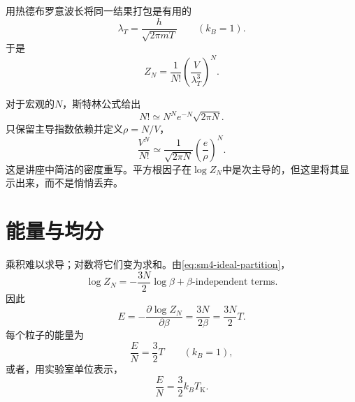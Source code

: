 用热德布罗意波长将同一结果打包是有用的
\begin{equation}
 \lambda_T=\frac{h}{\sqrt{2\pi mT}}
 \qquad (k_B=1).
\end{equation}
于是
\begin{equation}
 Z_N=\frac{1}{N!}\left(\frac{V}{\lambda_T^3}\right)^N.
 \label{eq:sm4-thermal-wavelength-form}
\end{equation}

对于宏观的\(N\)，斯特林公式给出
\begin{equation}
 N!\simeq N^Ne^{-N}\sqrt{2\pi N}.
\end{equation}
只保留主导指数依赖并定义\(\rho=N/V\)，
\begin{equation}
 \frac{V^N}{N!}
 \simeq
 \frac{1}{\sqrt{2\pi N}}
 \left(\frac{e}{\rho}\right)^N.
 \label{eq:sm4-density-rewrite}
\end{equation}
这是讲座中简洁的密度重写。平方根因子在\(\log Z_N\)中是次主导的，但这里将其显示出来，而不是悄悄丢弃。

\begin{classroomqa}
\end{classroomqa}

\section{能量与均分}

乘积难以求导；对数将它们变为求和。由\eqref{eq:sm4-ideal-partition}，
\begin{equation}
 \log Z_N
 =-\frac{3N}{2}\log\beta+\text{\(\beta\)-independent terms}.
 \label{eq:sm4-log-ideal-partition}
\end{equation}
因此
\begin{equation}
 E
 =-\frac{\partial\log Z_N}{\partial\beta}
 =\frac{3N}{2\beta}
 =\frac{3N}{2}T.
 \label{eq:sm4-ideal-energy}
\end{equation}
每个粒子的能量为
\begin{equation}
 \frac{E}{N}=\frac{3}{2}T
 \qquad (k_B=1),
\end{equation}
或者，用实验室单位表示，
\begin{equation}
 \frac{E}{N}=\frac{3}{2}k_BT_{\mathrm K}.
 \label{eq:sm4-ideal-energy-lab}
\end{equation}

